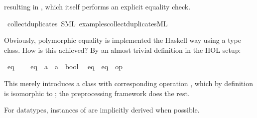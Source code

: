 \begin{isabellebody}
\begin{isamarkuptext}
  resulting in , which itself
  performs an explicit equality check.%
\end{isamarkuptext}%
\isamarkuptrue%
\isamarkupfalse%
\ collect{\isacharunderscore}duplicates\ {\isacharparenleft}SML\ {\isachardoublequoteopen}examples{\isacharslash}collect{\isacharunderscore}duplicates{\isachardot}ML{\isachardoublequoteclose}{\isacharparenright}%
\begin{isamarkuptext}%
%
\end{isamarkuptext}%
\isamarkuptrue%
%
\begin{isamarkuptext}%
Obviously, polymorphic equality is implemented the Haskell
  way using a type class.  How is this achieved?  By an
  almost trivial definition in the HOL setup:%
\end{isamarkuptext}%
\isamarkuptrue%
%
\isadelimML
%
\endisadelimML
%
\isatagML
%
\endisatagML
{\isafoldML}%
%
\isadelimML
\isanewline
%
\endisadelimML
{}\isamarkupfalse%
\ eq\ {\isacharequal}\isanewline
\ \ \ eq\ {\isacharcolon}{\isacharcolon}\ {\isachardoublequoteopen}{\isacharprime}a\ {\isasymRightarrow}\ {\isacharprime}a\ {\isasymRightarrow}\ bool{\isachardoublequoteclose}\isanewline
\isanewline
{}\isamarkupfalse%
\isanewline
\ \ eq\ {\isacharcolon}\ {\isachardoublequoteopen}eq\ {\isasymequiv}\ {\isacharparenleft}op\ {\isacharequal}{\isacharparenright}{\isachardoublequoteclose}%
\begin{isamarkuptext}%
This merely introduces a class  with corresponding
  operation , which by definition is isomorphic
  to ; the preprocessing framework does the rest.%
\end{isamarkuptext}%
\isamarkuptrue%
%
\isadelimML
%
\endisadelimML
%
\isatagML
%
\endisatagML
{\isafoldML}%
%
\isadelimML
%
\endisadelimML
%
\begin{isamarkuptext}%
For datatypes, instances of  are implicitly derived
  when possible.


\end{isamarkuptext}
\end{isabellebody}
